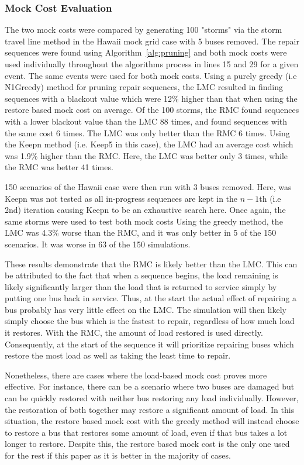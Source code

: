 \documentclass[12pt]{article}
\begin{document}
\subsubsection{Mock Cost Evaluation} \label{MCostEval}
The two mock costs were compared by generating 100 "storms" via the storm travel line method in the Hawaii mock grid case with 5 buses removed. The repair sequences were found using Algorithm~\ref{alg:pruning} and both mock costs were used individually throughout the algorithms process in lines 15 and 29 for a given event. The same events were used for both mock costs. Using a purely greedy (i.e N1Greedy) method for pruning repair sequences, the LMC resulted in finding sequences with a blackout value which were 12\% higher than that when using the restore based mock cost on average. Of the 100 storms, the RMC found sequences with a lower blackout value than the LMC 88 times, and found sequences with the same cost 6 times. The LMC was only better than the RMC 6 times. Using the Keepn method (i.e. Keep5 in this case), the LMC had an average cost which was 1.9\% higher than the RMC. Here, the LMC was better only 3 times, while the RMC was better 41 times. \par
150 scenarios of the Hawaii case were then run with 3 buses removed. Here, was Keepn was not tested as all in-progress sequences are kept in the $n-1$th (i.e 2nd) iteration causing Keepn to be an exhaustive search here. Once again, the same storms were used to test both mock costs Using the greedy method, the LMC was 4.3\% worse than the RMC, and it was only better in 5 of the 150 scenarios. It was worse in 63 of the 150 simulations. \par
These results demonstrate that the RMC is likely better than the LMC. This can be attributed to the fact that when a sequence begins, the load remaining is likely significantly larger than the load that is returned to service simply by putting one bus back in service. Thus, at the start the actual effect of repairing a bus probably has very little effect on the LMC. The simulation will then likely simply choose the bus which is the fastest to repair, regardless of how much load it restores. With the RMC, the amount of load restored is used directly. Consequently, at the start of the sequence it will prioritize repairing buses which restore the most load as well as taking the least time to repair. \par
Nonetheless, there are cases where the load-based mock cost proves more effective. For instance, there can be a scenario where two buses are damaged but can be quickly restored with neither bus restoring any load individually. However, the restoration of both together may restore a significant amount of load. In this situation, the restore based mock cost with the greedy method will instead choose to restore a bus that restores some amount of load, even if that bus takes a lot longer to restore. Despite this, the restore based mock cost is the only one used for the rest if this paper as it is better in the majority of cases.
\end{document}
